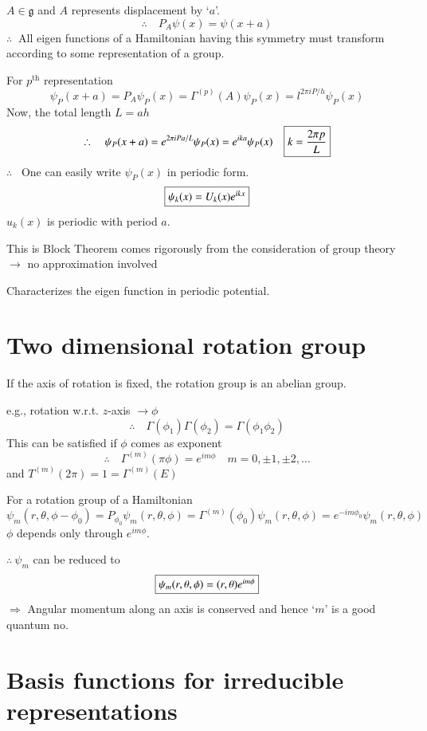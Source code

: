 $A\in \mathfrak{g}$ and $A$ represents displacement by `$a$'.
$$
\therefore\quad P_{A}\psi(x)=\psi(x+a)
$$
$\therefore \ $ All eigen functions of a Hamiltonian having this symmetry must transform according to some representation of a group.

For $p^{\text{th}}$ representation
$$
\psi_{P}(x+a)=P_{A}\psi_{P}(x)=\Gamma^{(p)}(A)\psi_{P}(x)=l^{2\pi iP/h}\psi_{P}(x)
$$
Now, the total length $L=ah$
$$
\therefore\quad \psi_{P}(x+a)=e^{2\pi iPa/L}\psi_{P}(x)=e^{ika}\psi_{P}(x)\quad \fbox{$k=\dfrac{2\pi p}{L}$}
$$
$\therefore$ \ One can easily write $\psi_{P}(x)$ in periodic form.
$$
\fbox{$\psi_{k}(x)=U_{k}(x)e^{ikx}$}
$$
$u_{k}(x)$ is periodic with period $a$.

This is Block Theorem comes rigorously from the consideration of group theory $\to$ no approximation involved

\smallskip


\smallskip

Characterizes the eigen function in periodic potential.

\section*{Two dimensional rotation group}

If the axis of rotation is fixed, the rotation group is an abelian group.

e.g., rotation w.r.t. $z$-axis $\to \phi$
$$
\therefore\quad \Gamma(\phi_{1})\Gamma(\phi_{2})=\Gamma(\phi_{1}\phi_{2})
$$
This can be satisfied if $\phi$ comes as exponent 
$$
\therefore\quad \Gamma^{(m)}(\pi \phi)=e^{im\phi}\quad m=0,\pm 1,\pm 2,\ldots
$$
and $T^{(m)}(2\pi)=1=\Gamma^{(m)}(E)$

For a rotation group of a Hamiltonian
$$
\psi_{m}(r,\theta,\phi-\phi_{0})=P_{\phi_{0}}\psi_{m}(r,\theta,\phi)=\Gamma^{(m)}(\phi_{0})\psi_{m}(r,\theta,\phi)=e^{-im\phi_{0}}\psi_{m}(r,\theta,\phi)
$$
$\phi$ depends only through $e^{im\phi}$.

$\therefore \ \psi_{m}$ can be reduced to
$$
\fbox{$\psi_{m}(r,\theta,\phi)=(r,\theta)e^{im\phi}$}
$$
$\Rightarrow$ Angular momentum along an axis is conserved and hence `$m$' is a good quantum no.

\section*{Basis functions for irreducible representations}

